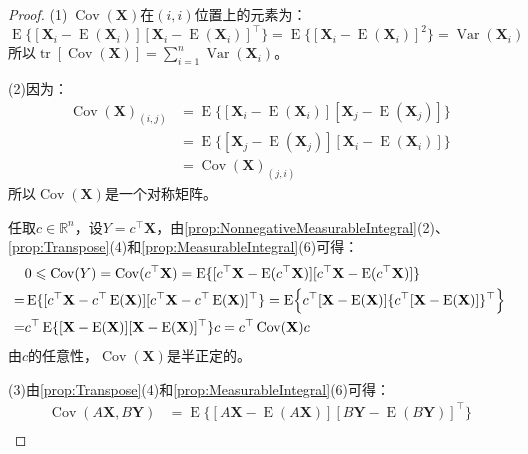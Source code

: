 \begin{proof}
	(1)$\;\operatorname{Cov}(\mathbf{X})$在$(i,i)$位置上的元素为：
	\begin{equation*}
		\operatorname{E}\{[\mathbf{X}_i-\operatorname{E}(\mathbf{X}_i)][\mathbf{X}_i-\operatorname{E}(\mathbf{X}_i)]^{\top}\}=\operatorname{E}\{[\mathbf{X}_i-\operatorname{E}(\mathbf{X}_i)]^2\}=\operatorname{Var}(\mathbf{X}_i)
	\end{equation*}
	所以$\operatorname{tr}[\operatorname{Cov}(\mathbf{X})]=\sum\limits_{i=1}^{n}\operatorname{Var}(\mathbf{X}_i)$。\par
	(2)因为：
	\begin{align*}
		\operatorname{Cov}(\mathbf{X})_{(i,j)}
		&=\operatorname{E}\{[\mathbf{X}_i-\operatorname{E}(\mathbf{X}_i)][\mathbf{X}_j-\operatorname{E}(\mathbf{X}_j)]\} \\
		&=\operatorname{E}\{[\mathbf{X}_j-\operatorname{E}(\mathbf{X}_j)][\mathbf{X}_i-\operatorname{E}(\mathbf{X}_i)]\} \\
		&=\operatorname{Cov}(\mathbf{X})_{(j,i)}
	\end{align*}
	所以$\operatorname{Cov}(\mathbf{X})$是一个对称矩阵。\par
	任取$c\in\mathbb{R}^{n}$，设$Y=c^{\top}\mathbf{X}$，由\cref{prop:NonnegativeMeasurableIntegral}(2)、\cref{prop:Transpose}(4)和\cref{prop:MeasurableIntegral}(6)可得：
	\begin{align*}
		&0\leqslant\operatorname{Cov}(Y)=\operatorname{Cov}(c^{\top}\mathbf{X})=\operatorname{E}\{[c^{\top}\mathbf{X}-\operatorname{E}(c^{\top}\mathbf{X})][c^{\top}\mathbf{X}-\operatorname{E}(c^{\top}\mathbf{X})]\} \\
		=&\operatorname{E}\{[c^{\top}\mathbf{X}-c^{\top}\operatorname{E}(\mathbf{X})][c^{\top}\mathbf{X}-c^{\top}\operatorname{E}(\mathbf{X})]^{\top}\}=\operatorname{E}\Bigl\{c^{\top}[\mathbf{X}-\operatorname{E}(\mathbf{X})]\{c^{\top}[\mathbf{X}-\operatorname{E}(\mathbf{X})]\}^{\top}\Bigr\} \\
		=&c^{\top}\operatorname{E}\{[\mathbf{X}-\operatorname{E}(\mathbf{X})][\mathbf{X}-\operatorname{E}(\mathbf{X})]^{\top}\}c=c^{\top}\operatorname{Cov}(\mathbf{X})c
	\end{align*}
	由$c$的任意性，$\operatorname{Cov}(\mathbf{X})$是半正定的。\par
	(3)由\cref{prop:Transpose}(4)和\cref{prop:MeasurableIntegral}(6)可得：
	\begin{align*}
		\operatorname{Cov}(A\mathbf{X},B\mathbf{Y})
		&=\operatorname{E}\{[A\mathbf{X}-\operatorname{E}(A\mathbf{X})][B\mathbf{Y}-\operatorname{E}(B\mathbf{Y})]^{\top}\} \\

\end{align*}
\end{proof}
